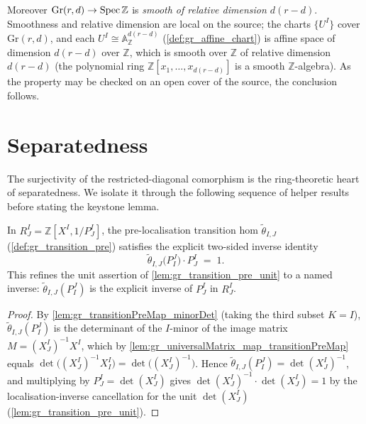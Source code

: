 \begin{definition}
  Moreover \(\mathrm{Gr}(r,d) \to \operatorname{Spec} \mathbb{Z}\) is \emph{smooth of relative
  dimension \(d(r-d)\)}. Smoothness and relative dimension are local on the
  source; the charts \(\{U^I\}\) cover \(\mathrm{Gr}(r,d)\), and each
  \(U^I \cong \mathbb{A}^{d(r-d)}_{\mathbb{Z}}\) (\cref{def:gr_affine_chart}) is
  affine space of dimension \(d(r-d)\) over \(\mathbb{Z}\), which is smooth over
  \(\mathbb{Z}\) of relative dimension \(d(r-d)\) (the polynomial ring
  \(\mathbb{Z}[x_1, \dots, x_{d(r-d)}]\) is a smooth \(\mathbb{Z}\)-algebra). As
  the property may be checked on an open cover of the source, the conclusion
  follows.
\end{definition}

\section{Separatedness}
\label{sec:gr_separated}

The surjectivity of the restricted-diagonal comorphism is the ring-theoretic
heart of separatedness. We isolate it through the following sequence of
helper results before stating the keystone lemma.

\begin{lemma}[Two-sided inverse identity \(\tilde\theta_{I,J}(P^J_I)\,P^I_J = 1\)]\leanok
  \label{lem:gr_transitionPreMap_minorDet_swap_mul}
  In \(R^I_J = \mathbb{Z}[X^I, 1/P^I_J]\), the pre-localisation transition hom
  \(\tilde\theta_{I,J}\) (\cref{def:gr_transition_pre}) satisfies the explicit
  two-sided inverse identity
  \[
    \tilde\theta_{I,J}\bigl(P^J_I\bigr) \cdot P^I_J \;=\; 1 .
  \]
  This refines the unit assertion of \cref{lem:gr_transition_pre_unit} to a named
  inverse: \(\tilde\theta_{I,J}(P^J_I)\) is the explicit inverse of \(P^I_J\) in
  \(R^I_J\).
\end{lemma}
\begin{proof}
  \leanok
  By \cref{lem:gr_transitionPreMap_minorDet} (taking the third subset \(K = I\)),
  \(\tilde\theta_{I,J}(P^J_I)\) is the determinant of the \(I\)-minor of the image
  matrix \(M = (X^I_J)^{-1} X^I\), which by
  \cref{lem:gr_universalMatrix_map_transitionPreMap} equals
  \(\det\bigl((X^I_J)^{-1} X^I_I\bigr) = \det\bigl((X^I_J)^{-1}\bigr)\). Hence
  \(\tilde\theta_{I,J}(P^J_I) = \det(X^I_J)^{-1}\), and multiplying by \(P^I_J =
  \det(X^I_J)\) gives \(\det(X^I_J)^{-1} \cdot \det(X^I_J) = 1\) by the
  localisation-inverse cancellation for the unit \(\det(X^I_J)\)
  (\cref{lem:gr_transition_pre_unit}).
\end{proof}

